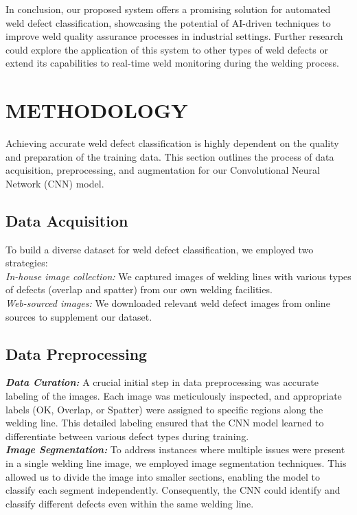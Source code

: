 \documentclass{article_saj}
\begin{document}
\indent
In conclusion, our proposed system offers a promising solution for automated weld defect classification, showcasing the potential of AI-driven techniques to improve weld quality assurance processes in industrial settings. Further research could explore the application of this system to other types of weld defects or extend its capabilities to real-time weld monitoring during the welding process.

\section{METHODOLOGY}

\indent
Achieving accurate weld defect classification is highly dependent on the quality and preparation of the training data. This section outlines the process of data acquisition, preprocessing, and augmentation for our Convolutional Neural Network (CNN) model.

\subsection{Data Acquisition}
\indent
To build a diverse dataset for weld defect classification, we employed two strategies:\\
\indent
\textit{In-house image collection:} We captured images of welding lines with various types of defects (overlap and spatter) from our own welding facilities.\\
\indent
\textit{Web-sourced images:} We downloaded relevant weld defect images from online sources to supplement our dataset.



\subsection{Data Preprocessing}

\indent
\indent \textbf{\textit{Data Curation:}} A crucial initial step in data preprocessing was accurate labeling of the images. Each image was meticulously inspected, and appropriate labels (OK, Overlap, or Spatter) were assigned to specific regions along the welding line. This detailed labeling ensured that the CNN model learned to differentiate between various defect types during training.\\

\indent
\textbf{\textit{Image Segmentation:}} To address instances where multiple issues were present in a single welding line image, we employed image segmentation techniques. This allowed us to divide the image into smaller sections, enabling the model to classify each segment independently. Consequently, the CNN could identify and classify different defects even within the same welding line.\\
\end{document}

